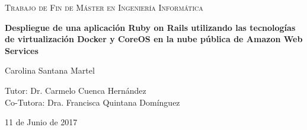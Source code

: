 \begin{titlepage}
	\centering
	\begin{figure}[H]
        \centering
	\end{figure}\par\vspace{1cm}
	{\scshape\Large Trabajo de Fin de Máster en Ingeniería Informática\par}
	\vspace{1.5cm}
	{\huge\bfseries Despliegue de una aplicación Ruby on Rails utilizando las tecnologías de virtualización Docker y CoreOS en la nube pública de Amazon Web Services\par}
	\vspace{2.5cm}
	{\Large Carolina Santana Martel\par}
	\vspace{1.5cm}
	Tutor: Dr. Carmelo Cuenca Hernández \\
        \vspace{0.5cm}
	Co-Tutora: Dra. Francisca Quintana Domínguez \\ 
        \vspace{1.5cm}
	{\large 11 de Junio de 2017\par}
\end{titlepage}

